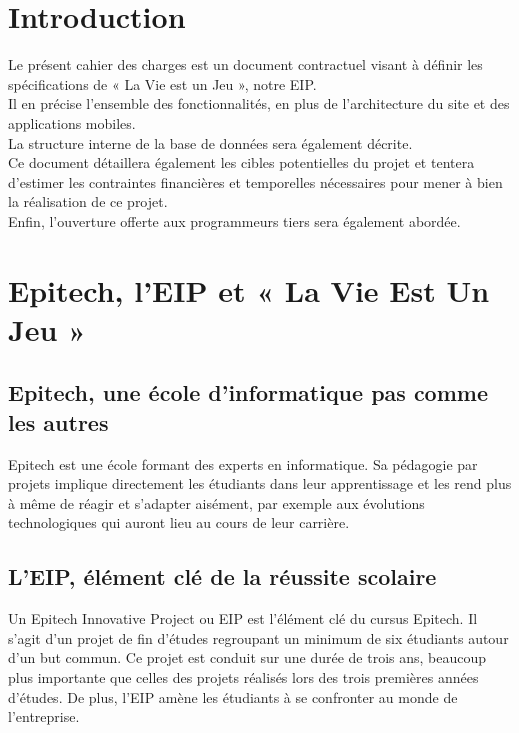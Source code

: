 \documentclass{life-fr}
\begin{document}

\chapter{Introduction}

Le présent cahier des charges est un document contractuel visant à définir les
spécifications de « La Vie est un Jeu », notre EIP.\\
Il en précise l’ensemble des fonctionnalités, en plus de l’architecture du site et
des applications mobiles.\\
La structure interne de la base de données sera également décrite.\\
Ce document détaillera également les cibles potentielles du projet et tentera
d’estimer les contraintes financières et temporelles nécessaires pour mener à bien
la réalisation de ce projet.\\
Enfin, l’ouverture offerte aux programmeurs tiers sera également abordée.



\chapter{Epitech, l'EIP et « La Vie Est Un Jeu »}

\section{Epitech, une école d'informatique pas comme les autres}

Epitech est une école formant des experts en informatique. Sa pédagogie par projets
implique directement les étudiants dans leur apprentissage et les rend plus à même
de réagir et s'adapter aisément, par exemple aux évolutions technologiques qui
auront lieu au cours de leur carrière.

\section{L'EIP, élément clé de la réussite scolaire}

Un Epitech Innovative Project ou EIP est l'élément clé du cursus Epitech. Il s'agit d'un projet de fin d'études regroupant un minimum de six étudiants autour d'un but commun. Ce projet est conduit sur une durée de trois ans, beaucoup plus importante que celles des projets réalisés lors des trois premières années d'études. De plus, l'EIP amène les étudiants à se confronter au monde de l'entreprise.
\end{document}
